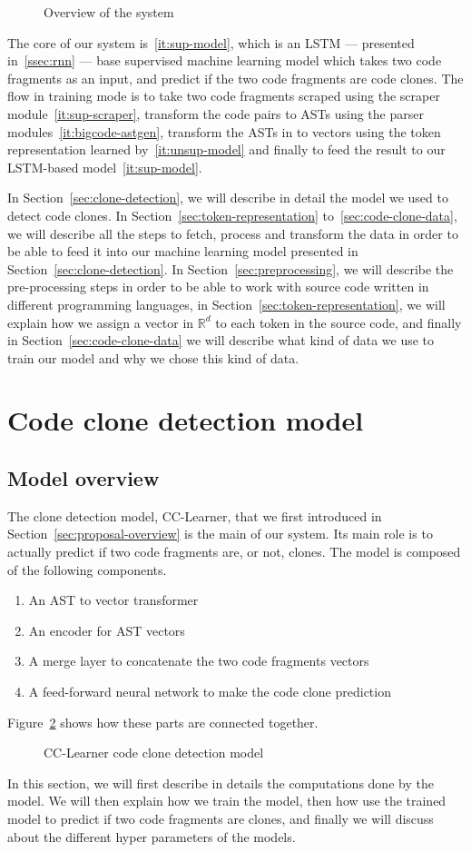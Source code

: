 \begin{figure}
\caption{\label{fig:system-overview}Overview of the system}
\end{figure}

The core of our system is~\ref{it:sup-model}, which is an LSTM --- presented
in~\ref{ssec:rnn} --- base supervised machine learning model which takes two
code fragments as an input, and predict if the two code fragments are code
clones. The flow in training mode is to take two code fragments scraped
using the scraper module~\ref{it:sup-scraper}, transform the code pairs to ASTs
using the parser modules~\ref{it:bigcode-astgen}, transform the ASTs in to
vectors using the token representation learned by~\ref{it:unsup-model} and
finally to feed the result to our LSTM-based model~\ref{it:sup-model}.

In Section~\ref{sec:clone-detection}, we will describe in detail the model we
used to detect code clones. In Section~\ref{sec:token-representation}
to~\ref{sec:code-clone-data}, we will describe all the steps to fetch, process
and transform the data in order to be able to feed it into our machine learning
model presented in Section~\ref{sec:clone-detection}.
In Section~\ref{sec:preprocessing}, we will describe the pre-processing steps in
order to be able to work with source code written in different programming
languages, in Section~\ref{sec:token-representation}, we will explain how we
assign a vector in $\mathbb{R}^d$ to each token in the source code, and finally
in Section~\ref{sec:code-clone-data} we will describe what kind of data we use
to train our model and why we chose this kind of data.
%
\section{\label{sec:clone-detection}Code clone detection model}
\subsection{Model overview}
The clone detection model, CC-Learner, that we first introduced in
Section~\ref{sec:proposal-overview} is the main of our system. Its main role is
to actually predict if two code fragments are, or not, clones. The model is
composed of the following components.
\begin{enumerate}
\item An AST to vector transformer
\item An encoder for AST vectors
\item A merge layer to concatenate the two code fragments vectors
\item A feed-forward neural network to make the code clone prediction
\end{enumerate}
%
Figure~\ref{fig:clone-detection-model} shows how these parts are connected
together.
%
\begin{figure}
\caption{\label{fig:clone-detection-model}CC-Learner code clone detection model}
\end{figure}
%
In this section, we will first describe in details the computations done by the
model. We will then explain how we train the model, then how use the trained
model to predict if two code fragments are clones, and finally we will discuss
about the different hyper parameters of the models.
%
